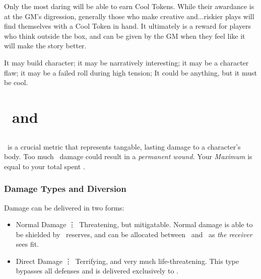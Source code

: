 Only the most daring will be able to earn Cool Tokens. While their awardance is at the GM's digression, generally those who make creative and...riskier plays will find themselves with a Cool Token in hand. It ultimately is a reward for players who think outside the box, and can be given by the GM when they feel like it will make the story better.

It may build character; it may be narratively interesting; it may be a character flaw; it may be a failed roll during high tension; It could be anything, but it must be cool.


\chapter{\HPful\ and \ENful}\label{ch:hp_and_en}
\section{\HPful\index{\HPful}}\label{sec:hp}
\HPful\ is a crucial metric that represents tangable, lasting damage to a character's body. Too much \HPful\ damage could result in a
\textit{permanent wound.} Your \emph{Maximum \HPful} is equal to your total spent \attrval{}.


\subsection{Damage Types and Diversion}\label{subsec:damage_types}
Damage can be delivered in two forms:
\begin{itemize}
	\item Normal Damage \vdots\ Threatening, but mitigatable. Normal damage is able to be shielded by \ENful\ reserves, and can be allocated between \HPful\ and \ENful\ as \emph{the receiver} sees fit.
	\item Direct Damage \vdots\ Terrifying, and very much life-threatening. This type bypasses all defenses and is delivered exclusively to \HPful .
\end{itemize}

